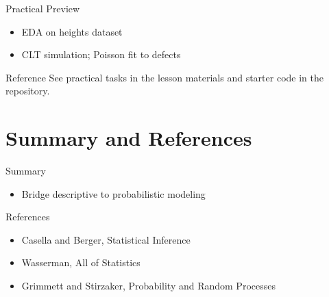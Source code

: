 \documentclass{beamer}
\newcommand{\1}{\mathbf{1}}
\begin{document}
\begin{frame}{Practical Preview}
  \begin{itemize}
    \item EDA on heights dataset
    \item CLT simulation; Poisson fit to defects
  \end{itemize}
  \begin{block}{Reference}
    See practical tasks in the lesson materials and starter code in the repository.
  \end{block}
\end{frame}

\section{Summary and References}

\begin{frame}{Summary}
  \begin{itemize}
    \item Bridge descriptive to probabilistic modeling
  \end{itemize}
\end{frame}

\begin{frame}{References}
  \begin{itemize}
    \item Casella and Berger, Statistical Inference
    \item Wasserman, All of Statistics
    \item Grimmett and Stirzaker, Probability and Random Processes
  \end{itemize}
\end{frame}
\end{document}

